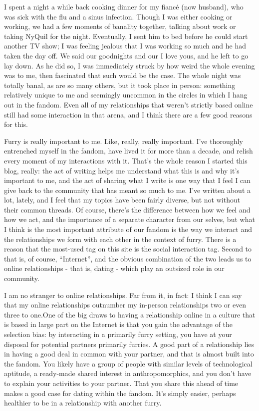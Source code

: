 
I spent a night a while back cooking dinner for my fiancé (now husband), who was sick with the flu and a sinus infection. Though I was either cooking or working, we had a few moments of banality together, talking about work or taking NyQuil for the night. Eventually, I sent him to bed before he could start another TV show; I was feeling jealous that I was working so much and he had taken the day off. We said our goodnights and our I love yous, and he left to go lay down. As he did so, I was immediately struck by how weird the whole evening was to me, then fascinated that such would be the case. The whole night was totally banal, as are so many others, but it took place in person: something relatively unique to me and seemingly uncommon in the circles in which I hang out in the fandom. Even all of my relationships that weren't strictly based online still had some interaction in that arena, and I think there are a few good reasons for this.

Furry is really important to me. Like, really, really important. I've thoroughly entrenched myself in the fandom, have lived it for more than a decade, and relish every moment of my interactions with it. That's the whole reason I started this blog, really: the act of writing helps me understand what this is and why it's important to me, and the act of sharing what I write is one way that I feel I can give back to the community that has meant so much to me. I've written about a lot, lately, and I feel that my topics have been fairly diverse, but not without their common threads. Of course, there's the difference between how we feel and how we act, and the importance of a separate character from our selves, but what I think is the most important attribute of our fandom is the way we interact and the relationships we form with each other in the context of furry. There is a reason that the most-used tag on this site is the social interaction tag. Second to that is, of course, ``Internet'', and the obvious combination of the two leads us to online relationships - that is, dating - which play an outsized role in our community.

I am no stranger to online relationships. Far from it, in fact: I think I can say that my online relationships outnumber my in-person relationships two or even three to one.One of the big draws to having a relationship online in a culture that is based in large part on the Internet is that you gain the advantage of the selection bias: by interacting in a primarily furry setting, you have at your disposal for potential partners primarily furries. A good part of a relationship lies in having a good deal in common with your partner, and that is almost built into the fandom. You likely have a group of people with similar levels of technological aptitude, a ready-made shared interest in anthropomorphics, and you don't have to explain your activities to your partner. That you share this ahead of time makes a good case for dating within the fandom. It's simply easier, perhaps healthier to be in a relationship with another furry.

